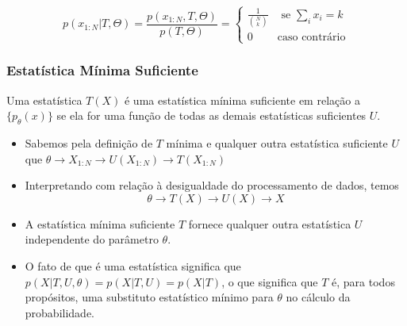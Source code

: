 \begin{frame}[allowframebreaks]
\begin{example}
\begin{itemize}
                        \begin{equation}
                        p(x_{1:N} \vert T, \Theta) = \frac{p(x_{1:N},T,\Theta)}{p(T,\Theta)} = 
                                \begin{cases}
                                \frac{1}{{N \choose k}} & \text{ se } \sum_i x_i = k \\
                                0       & \text{caso contrário}
                                \end{cases}
                        \end{equation}
        \end{itemize}
  \end{example}
\end{frame}

\begin{frame}[allowframebreaks]
  \frametitle{Estatística Mínima Suficiente}
        \begin{definition}
        Uma estatística $T(X)$ é uma estatística mínima suficiente em relação a $\{p_\theta(x)\}$
        se ela for uma função de todas as demais estatísticas suficientes $U$.
        \end{definition}
        \begin{itemize}
        \item Sabemos pela definição de $T$ mínima e qualquer outra estatística suficiente $U$ que
                $\theta \rightarrow X_{1:N} \rightarrow U(X_{1:N}) \rightarrow T(X_{1:N})$
        \item Interpretando com relação à desigualdade do processamento de dados, temos
                \begin{equation}
                \theta \rightarrow T(X) \rightarrow U(X) \rightarrow X
                \end{equation}
        \item A estatística mínima suficiente $T$ fornece qualquer outra estatística $U$ 
                independente do parâmetro $\theta$.
        \item O fato de que é uma estatística significa que
                $p(X|T,U,\theta) = p(X|T,U) = p(X|T)$, o que significa que $T$ é,
                para todos propósitos, uma substituto estatístico mínimo para $\theta$
                no cálculo da probabilidade.
        \end{itemize}   
\end{frame}



